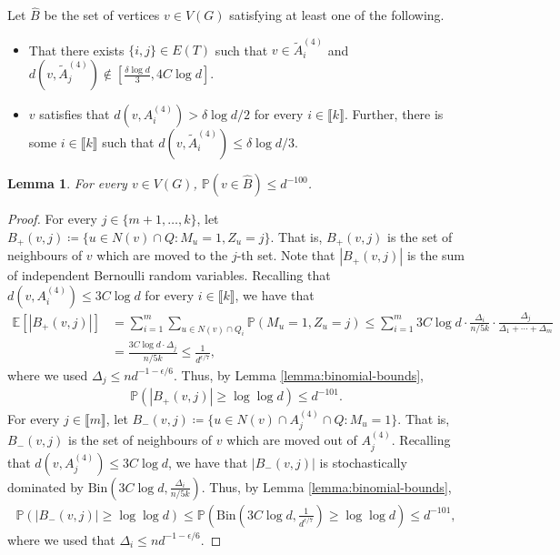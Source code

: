 \documentclass[notitlepage]{scrartcl}
\newcommand{\br}[1]{\llbracket{#1}\rrbracket}
\newtheorem{lemma}[thm]{Lemma}
\begin{document}
Let $\hat{B}$ be the set of vertices $v\in V(G)$ satisfying at least one of the following.
\begin{itemize}
    \item That there exists $\{i,j\}\in E(T)$ such that $v\in \tilde{A}_i^{(4)}$ and $d(v,\tilde{A}_j^{(4)})\notin \left[\frac{\delta\log d}{3}, 4C\log d\right]$.
    \item $v$ satisfies that $d(v,A_i^{(4)})>\delta \log d/2$ for every $i\in \br{k}$. Further, there is some $i\in \br{k}$ such that $d(v,\tilde{A}_i^{(4)})\le \delta\log d/3$.
\end{itemize} 
\begin{lemma}\label{l: hat B}
For every $v\in V(G)$, $\mathbb{P}\left(v\in \hat{B}\right)\le d^{-100}$.
\end{lemma}
\begin{proof}
For every $j\in \{m+1,\ldots, k\}$, let $B_+(v,j)\coloneqq \{u\in N(v)\cap Q : M_u=1, Z_u=j\}$. That is, $B_+(v,j)$ is the set of neighbours of $v$ which are moved to the $j$-th set. Note that $|B_+(v,j)|$ is the sum of independent Bernoulli random variables. Recalling that $d(v,A_i^{(4)})\leq 3C\log d$ for every $i\in\br{k}$, we have that
\begin{align*}
    \mathbb{E}\left[|B_+(v,j)|\right]&=\sum_{i=1}^m\sum_{u\in N(v)\cap Q_i}\mathbb{P}(M_u=1,Z_u=j)\le \sum_{i=1}^{m}3C\log d \cdot \frac{\Delta_i}{n/5k}\cdot \frac{\Delta_j}{\Delta_1+\cdots+\Delta_m}\\
    &=\frac{3C\log d\cdot \Delta_j}{n/5k}\le \frac{1}{d^{\epsilon/7}},
\end{align*}
where we used $\Delta_j\le nd^{-1-\epsilon/6}$. Thus, by Lemma \ref{lemma:binomial-bounds},
\begin{align*}
    \mathbb{P}\left(|B_+(v,j)|\ge \log\log d\right)\le d^{-101}.
\end{align*}
For every $j\in \br{m}$, let $B_-(v,j)\coloneqq \{u\in N(v)\cap A_j^{(4)}\cap Q\colon M_u=1\}$. That is, $B_-(v,j)$ is the set of neighbours of $v$ which are moved out of $A_j^{(4)}$. Recalling that $d(v,A_j^{(4)})\leq 3C\log d$, we have that $|B_-(v,j)|$ is stochastically dominated by $\text{Bin}\left(3C\log d,\frac{\Delta_i}{n/5k}\right)$. Thus, by Lemma \ref{lemma:binomial-bounds},
\begin{align*}
    \mathbb{P}\left(|B_-(v,j)|\ge \log\log d\right)\le \mathbb{P}\left(\text{Bin}\left(3C\log d,\frac{1}{d^{\epsilon/7}}\right)\ge \log\log d\right)\le d^{-101},
\end{align*}
where we used that $\Delta_i\le nd^{-1-\epsilon/6}$.


\end{proof}
\end{document}
